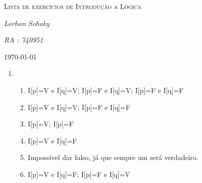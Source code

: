 \documentclass[12pt]{article}
\begin{document}
	\begin{titlepage}
		\centering
			{\scshape\LARGE Lista de exercícios de Introdução a Lógica \par}
		\vspace{4cm}
			{\Large\itshape Lorhan Sohaky\par}
		\vspace{0.3cm}
			{\scshape\itshape RA : 740951\par}
		\vfill
	{\large \today\par}
	\end{titlepage}
	
	\begin{enumerate}
	  \item \begin{enumerate}
	    		\item I[p]=V e I[q]=V; I[p]=F e I[q]=V; I[p]=F e I[q]=F
	    		\item I[p]=V e I[q]=V; I[p]=F e I[q]=F
	    		\item I[p]=V; I[p]=F
	    		\item I[p]=V e I[q]=F
	    		\item Impossível dar falso, já que sempre um será verdadeiro.
	    		\item I[p]=V e I[q]=F; I[p]=F e I[q]=V
	    		  
	  		\end{enumerate}
	\end{enumerate}
\end{document}
